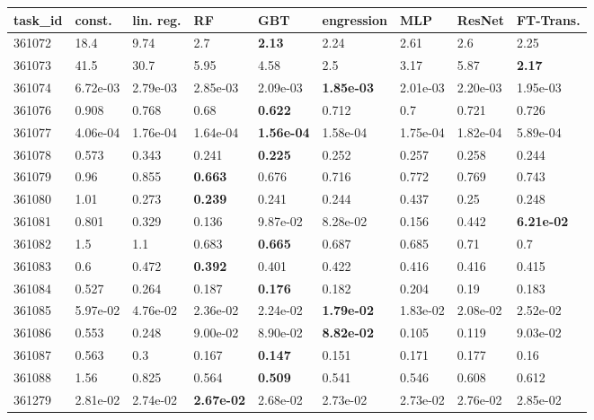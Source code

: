 \begin{table}[ht!]
\centering
\begingroup\footnotesize
\begin{tabular}{lllllllll}
  \hline
\hline
task\_id & const. & lin. reg. & RF & GBT & engression & MLP & ResNet & FT-Trans. \\ 
  \hline
361072 & 18.4 & 9.74 & 2.7 & \textbf{2.13} & 2.24 & 2.61 & 2.6 & 2.25 \\ 
  361073 & 41.5 & 30.7 & 5.95 & 4.58 & 2.5 & 3.17 & 5.87 & \textbf{2.17} \\ 
  361074 & 6.72e-03 & 2.79e-03 & 2.85e-03 & 2.09e-03 & \textbf{1.85e-03} & 2.01e-03 & 2.20e-03 & 1.95e-03 \\ 
  361076 & 0.908 & 0.768 & 0.68 & \textbf{0.622} & 0.712 & 0.7 & 0.721 & 0.726 \\ 
  361077 & 4.06e-04 & 1.76e-04 & 1.64e-04 & \textbf{1.56e-04} & 1.58e-04 & 1.75e-04 & 1.82e-04 & 5.89e-04 \\ 
  361078 & 0.573 & 0.343 & 0.241 & \textbf{0.225} & 0.252 & 0.257 & 0.258 & 0.244 \\ 
  361079 & 0.96 & 0.855 & \textbf{0.663} & 0.676 & 0.716 & 0.772 & 0.769 & 0.743 \\ 
  361080 & 1.01 & 0.273 & \textbf{0.239} & 0.241 & 0.244 & 0.437 & 0.25 & 0.248 \\ 
  361081 & 0.801 & 0.329 & 0.136 & 9.87e-02 & 8.28e-02 & 0.156 & 0.442 & \textbf{6.21e-02} \\ 
  361082 & 1.5 & 1.1 & 0.683 & \textbf{0.665} & 0.687 & 0.685 & 0.71 & 0.7 \\ 
  361083 & 0.6 & 0.472 & \textbf{0.392} & 0.401 & 0.422 & 0.416 & 0.416 & 0.415 \\ 
  361084 & 0.527 & 0.264 & 0.187 & \textbf{0.176} & 0.182 & 0.204 & 0.19 & 0.183 \\ 
  361085 & 5.97e-02 & 4.76e-02 & 2.36e-02 & 2.24e-02 & \textbf{1.79e-02} & 1.83e-02 & 2.08e-02 & 2.52e-02 \\ 
  361086 & 0.553 & 0.248 & 9.00e-02 & 8.90e-02 & \textbf{8.82e-02} & 0.105 & 0.119 & 9.03e-02 \\ 
  361087 & 0.563 & 0.3 & 0.167 & \textbf{0.147} & 0.151 & 0.171 & 0.177 & 0.16 \\ 
  361088 & 1.56 & 0.825 & 0.564 & \textbf{0.509} & 0.541 & 0.546 & 0.608 & 0.612 \\ 
  361279 & 2.81e-02 & 2.74e-02 & \textbf{2.67e-02} & 2.68e-02 & 2.73e-02 & 2.73e-02 & 2.76e-02 & 2.85e-02 \\ 

\end{tabular}
\end{table}

